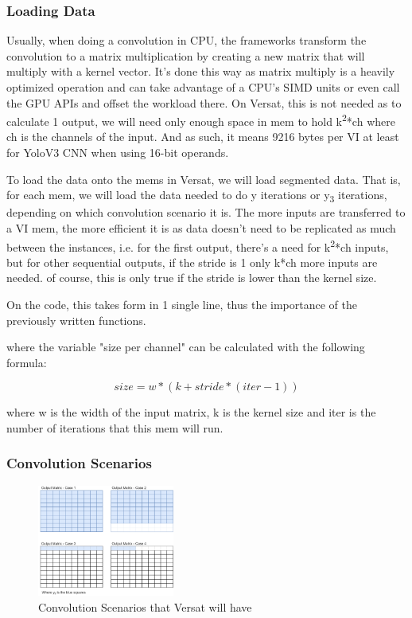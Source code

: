 \documentclass[conference]{IEEEtran}
\begin{document}
\subsubsection{Loading Data}

Usually, when doing a convolution in CPU, the frameworks transform the convolution to a matrix multiplication by creating a new matrix that will multiply with a
kernel vector. It's done this way as matrix multiply is a heavily optimized operation and can take advantage of a CPU's SIMD units or even call the GPU APIs
and offset the workload there. On Versat, this is not needed as to calculate 1 output, we will need only enough space in mem to hold
k\textsuperscript{2}*ch where ch is the channels of the input. And as such, it means 9216 bytes per VI at least for YoloV3 CNN when using 16-bit operands.

To load the data onto the mems in Versat, we will load segmented data. That is, for each mem, we will load the data
needed to do y iterations or y\textsubscript{3} iterations, depending on which convolution scenario it is.
The more inputs are transferred to a VI mem, the more efficient it is as data doesn't need to be replicated as much between the instances,
i.e. for the first output, there's a need for k\textsuperscript{2}*ch inputs, but for other sequential outputs, if the stride is 1 only k*ch more inputs are needed.
of course, this is only true if the stride is lower than the kernel size.

On the code, this takes form in 1 single line, thus the importance of the previously written functions.



where the variable "size per channel" can be calculated with the following formula:

\[ size=w*(k+stride*(iter-1)) \]

where w is the width of the input matrix, k is the kernel size and iter is the number of iterations that this mem will run.

\subsubsection{Convolution Scenarios}
\label{ConvolutionScenarios}

\begin{figure}[!htbp]
    \centering
    \includegraphics[width=0.4\textwidth]{Figures/Variables.drawio.png}
    \caption{Convolution Scenarios that Versat will have}
    \label{ConvScenarioss}
\end{figure}
\end{document}
